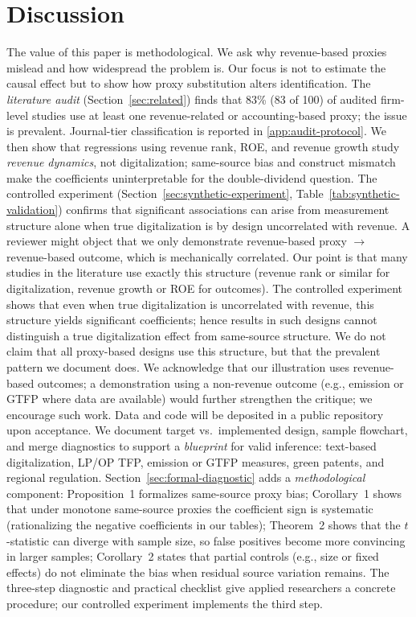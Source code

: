 
\section{Discussion}
\label{sec:discussion}

The value of this paper is methodological. We ask why revenue-based proxies mislead and how widespread the problem is. Our focus is not to estimate the causal effect but to show how proxy substitution alters identification. The \emph{literature audit} (Section~\ref{sec:related}) finds that 83\% (83 of 100) of audited firm-level studies use at least one revenue-related or accounting-based proxy; the issue is prevalent. Journal-tier classification is reported in \ref{app:audit-protocol}. We then show that regressions using revenue rank, ROE, and revenue growth study \emph{revenue dynamics}, not digitalization; same-source bias and construct mismatch make the coefficients uninterpretable for the double-dividend question. The controlled experiment (Section~\ref{sec:synthetic-experiment}, Table~\ref{tab:synthetic-validation}) confirms that significant associations can arise from measurement structure alone when true digitalization is by design uncorrelated with revenue. A reviewer might object that we only demonstrate revenue-based proxy $\to$ revenue-based outcome, which is mechanically correlated. Our point is that many studies in the literature use exactly this structure (revenue rank or similar for digitalization, revenue growth or ROE for outcomes). The controlled experiment shows that even when true digitalization is uncorrelated with revenue, this structure yields significant coefficients; hence results in such designs cannot distinguish a true digitalization effect from same-source structure. We do not claim that all proxy-based designs use this structure, but that the prevalent pattern we document does. We acknowledge that our illustration uses revenue-based outcomes; a demonstration using a non-revenue outcome (e.g., emission or GTFP where data are available) would further strengthen the critique; we encourage such work. Data and code will be deposited in a public repository upon acceptance. We document target vs.\ implemented design, sample flowchart, and merge diagnostics to support a \emph{blueprint} for valid inference: text-based digitalization, LP/OP TFP, emission or GTFP measures, green patents, and regional regulation. Section~\ref{sec:formal-diagnostic} adds a \emph{methodological} component: Proposition~1 formalizes same-source proxy bias; Corollary~1 shows that under monotone same-source proxies the coefficient sign is systematic (rationalizing the negative coefficients in our tables); Theorem~2 shows that the $t$-statistic can diverge with sample size, so false positives become more convincing in larger samples; Corollary~2 states that partial controls (e.g., size or fixed effects) do not eliminate the bias when residual source variation remains. The three-step diagnostic and practical checklist give applied researchers a concrete procedure; our controlled experiment implements the third step.

